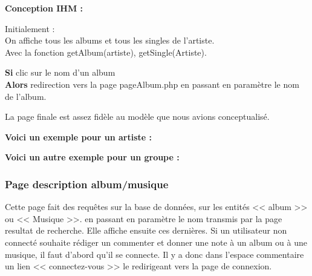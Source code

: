 			\begin{paragraphe}
				\textbf{Conception IHM :}
			\end{paragraphe}

			\begin{paragraphe}
				Initialement : \\
				On affiche tous les albums et tous les singles de l'artiste. \\
				Avec la fonction getAlbum(artiste), getSingle(Artiste).
			\end{paragraphe}

			\begin{paragraphe}
				\textbf{Si} clic sur le nom d'un album \\
				\textbf{Alors} redirection vers la page pageAlbum.php en passant en paramètre le nom de l'album.
			\end{paragraphe}


         \newpage

            \begin{paragraphe}
                La page finale est assez fidèle au modèle que nous avions conceptualisé.
            \end{paragraphe}

            \begin{paragraphe}
                \textbf{Voici un exemple pour un artiste :}
            \end{paragraphe}
            

            \begin{paragraphe}
                \textbf{Voici un autre exemple pour un groupe :}
            \end{paragraphe}
            

        \clearpage

		\subsubsection{Page description album/musique}

			\begin{paragraphe}
                Cette page fait des requêtes sur la base de données, sur les entités << album >> ou << Musique >>.
                 en passant en paramètre le nom transmis par la page resultat de recherche. Elle affiche ensuite ces dernières.
				Si un utilisateur non connecté souhaite rédiger un commenter et donner une note à un album ou à une musique,
				 il faut d'abord qu'il se connecte. Il y a donc dans l'espace commentaire un lien << connectez-vous >> le redirigeant vers la page de connexion.
			\end{paragraphe}


